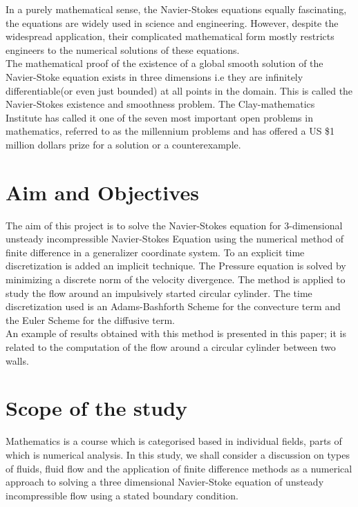 \documentclass[11pt]{report}
\begin{document}
	In a purely mathematical sense, the Navier-Stokes equations equally fascinating, the equations are widely used in science and engineering. However, despite the widespread application, their complicated mathematical form mostly restricts engineers to the numerical solutions of these equations.\\
	
	The mathematical proof of the existence of a global smooth solution of the Navier-Stoke equation exists in three dimensions i.e they are infinitely differentiable(or even just bounded) at all points in the domain. This is called the Navier-Stokes existence and smoothness problem. The Clay-mathematics Institute has called it one of the seven most important open problems in mathematics, referred to as the millennium problems and has offered a US \$1 million dollars prize for a solution or a counterexample.


	\section{Aim and Objectives}
	The aim of this project is to solve the Navier-Stokes equation for 3-dimensional unsteady incompressible Navier-Stokes Equation using the numerical method of finite difference in a generalizer coordinate system. To an explicit time discretization is added an implicit technique. The Pressure equation is solved by minimizing a discrete norm of the velocity divergence. The method is applied to study the flow around an impulsively started circular cylinder. The time discretization used is an Adams-Bashforth Scheme for the convecture term and the Euler Scheme for the diffusive term.\\
	
	An example of results obtained with this method is presented in this paper; it is related to the computation of the flow around a circular cylinder between two walls.

	\section{Scope of the study}
	Mathematics is a course which is categorised based in individual fields, parts of which is numerical analysis. In this study, we shall consider a discussion on types of fluids, fluid flow and the application of finite difference methods as a numerical approach to solving a three dimensional Navier-Stoke equation of unsteady incompressible flow using a stated boundary condition.
	
\end{document}

